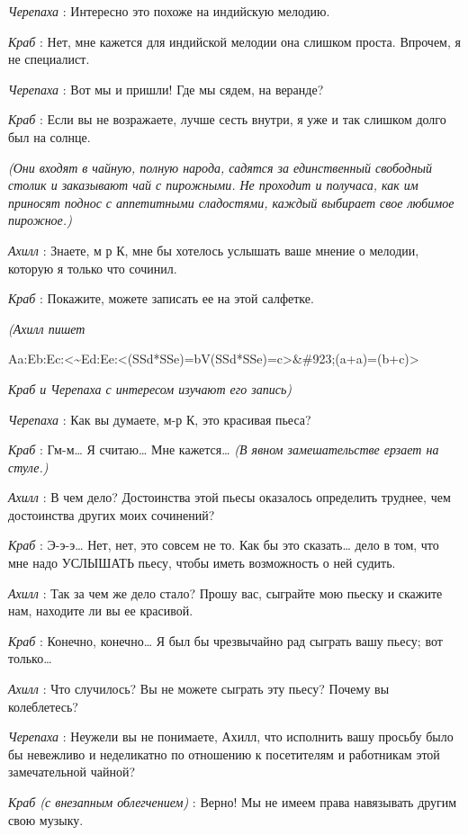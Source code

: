 \documentclass[../main.tex]{subfiles}
\begin{document}
\begin{dialogue}
\emph{Черепаха} : Интересно это похоже на индийскую мелодию.

\emph{Краб} : Нет, мне кажется для индийской мелодии она слишком проста. Впрочем, я не специалист.

\emph{Черепаха} : Вот мы и пришли! Где мы сядем, на веранде?

\emph{Краб} : Если вы не возражаете, лучше сесть внутри, я уже и так слишком долго был на солнце.

\emph{(Они входят в чайную, полную народа, садятся за единственный свободный столик и заказывают чай с пирожными. Не проходит и получаса, как им приносят поднос с аппетитными сладостями, каждый выбирает свое любимое пирожное.)}

\emph{Ахилл} : Знаете, м р К, мне бы хотелось услышать ваше мнение о мелодии, которую я только что сочинил.

\emph{Краб} : Покажите, можете записать ее на этой салфетке.

\emph{(Ахилл пишет}

Aa:Eb:Ec:\textless\textasciitilde Ed:Ee:\textless(SSd*SSe)=bV(SSd*SSe)=c\textgreater\&\#923;(a+a)=(b+c)\textgreater{}

\emph{Краб и Черепаха с интересом изучают его запись)}

\emph{Черепаха} : Как вы думаете, м-р К, это красивая пьеса?

\emph{Краб} : Гм-м\ldots{} Я считаю\ldots{} Мне кажется\ldots{} \emph{(В явном замешательстве ерзает на стуле.)}

\emph{Ахилл} : В чем дело? Достоинства этой пьесы оказалось определить труднее, чем достоинства других моих сочинений?

\emph{Краб} : Э-э-э\ldots{} Нет, нет, это совсем не то. Как бы это сказать\ldots{} дело в том, что мне надо УСЛЫШАТЬ пьесу, чтобы иметь возможность о ней судить.

\emph{Ахилл} : Так за чем же дело стало? Прошу вас, сыграйте мою пьеску и скажите нам, находите ли вы ее красивой.

\emph{Краб} : Конечно, конечно\ldots{} Я был бы чрезвычайно рад сыграть вашу пьесу; вот только\ldots{}

\emph{Ахилл} : Что случилось? Вы не можете сыграть эту пьесу? Почему вы колеблетесь?

\emph{Черепаха} : Неужели вы не понимаете, Ахилл, что исполнить вашу просьбу было бы невежливо и неделикатно по отношению к посетителям и работникам этой замечательной чайной?

\emph{Краб (с внезапным облегчением)} : Верно! Мы не имеем права навязывать другим свою музыку.


\end{dialogue}
\end{document}
